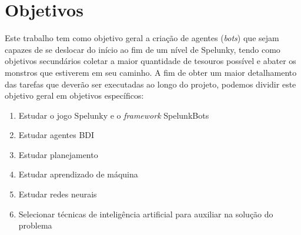 \chapter{\label{chap:objectives}Objetivos}
Este trabalho tem como objetivo geral a criação de agentes (\textit{bots}) que
sejam capazes de se deslocar do início ao fim de um nível de Spelunky, tendo
como objetivos secundários coletar a maior quantidade de tesouros possível e
abater os monstros que estiverem em seu caminho.  A fim de obter um maior
detalhamento das tarefas que deverão ser executadas ao longo do projeto,
podemos dividir este objetivo geral em objetivos específicos:

\begin{enumerate}
    \item Estudar o jogo Spelunky e o \textit{framework} SpelunkBots

	\item Estudar agentes BDI

	\item Estudar planejamento

	\item Estudar aprendizado de máquina

	\item Estudar redes neurais

	\item Selecionar técnicas de inteligência artificial para auxiliar na
	solução do problema
\end{enumerate}
